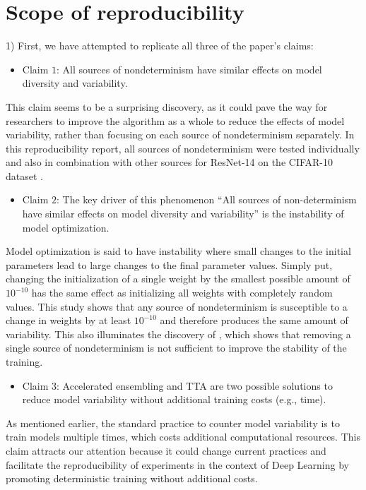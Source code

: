 \section{Scope of reproducibility}
\label{sec:Scope}
1) First, we have attempted to replicate all three of the paper's claims: 
\begin{itemize}
\item Claim $1$: All sources of nondeterminism have similar effects on model diversity and variability.
\end{itemize}
 This claim seems to be a surprising discovery, as it could pave the way for researchers to improve the algorithm as a whole to reduce the effects of model variability, rather than focusing on each source of nondeterminism separately. In this reproducibility report, all sources of nondeterminism were tested individually and also in combination with other sources for ResNet-14 \citep{he2016deep} on the CIFAR-10 dataset \citep{krizhevsky2009learning}. \begin{itemize}
 \item Claim $2$: The key driver of this phenomenon ``All sources of non-determinism have similar effects on model diversity and variability'' is the instability of model optimization.
\end{itemize}
Model optimization is said to have instability where small changes to the initial parameters lead to large changes to the final parameter values. Simply put, changing the initialization of a single weight by the smallest possible amount of $10^{-10}$ has the same effect as initializing all weights with completely random values. This study shows that any source of nondeterminism is susceptible to a change in weights by at least $10^{-10}$ and therefore produces the same amount of variability. This also illuminates the discovery of \citet{zhuang2021randomness}, which shows that removing a single source of nondeterminism is not sufficient to improve the stability of the training.
\begin{itemize}
 \item Claim $3$: Accelerated ensembling and TTA are two possible solutions to reduce model variability without additional training costs (e.g., time).
\end{itemize}
As mentioned earlier, the standard practice to counter model variability is to train models multiple times, which costs additional computational resources. This claim attracts our attention because it could change current practices and facilitate the reproducibility of experiments in the context of Deep Learning by promoting deterministic training without additional costs.
\newpage



